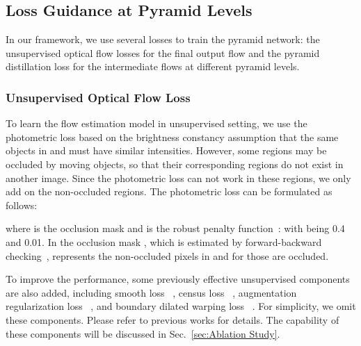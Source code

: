 \documentclass[final]{cvpr}
\begin{document}
\subsection{Loss Guidance at Pyramid Levels}\label{sec:algo_loss_functions}
In our framework, we use several losses to train the pyramid network: the unsupervised optical flow losses for the final output flow and the pyramid distillation loss for the intermediate flows at different pyramid levels.

\subsubsection{Unsupervised Optical Flow Loss}\label{sec:algo_unsupervised_photometric_loss}
To learn the flow estimation model  in unsupervised setting, we use the photometric loss  based on the brightness constancy assumption that the same objects in  and  must have similar intensities. However, some regions may be occluded by moving objects, so that their corresponding regions do not exist in another image. 
Since the photometric loss can not work in these regions, we only add  on the non-occluded regions. The photometric loss can be formulated as follows:

where  is the occlusion mask and  is the robust penalty function~\cite{Pengpeng2019}:  with  being 0.4 and 0.01. In the occlusion mask , which is estimated by forward-backward checking~\cite{unflow_2018aaai},  represents the non-occluded pixels in  and  for those are occluded. 


To improve the performance, some previously effective unsupervised components are also added, including smooth loss~\cite{wang2018} , 
census loss~\cite{unflow_2018aaai} ,
augmentation regularization loss~\cite{liu2020learning} , and boundary dilated warping loss~\cite{luo2020occinpflow} . 
For simplicity, we omit these components. Please refer to previous works for details. 
The capability of these components will be discussed in Sec.~\ref{sec:Ablation Study}. 
\end{document}
